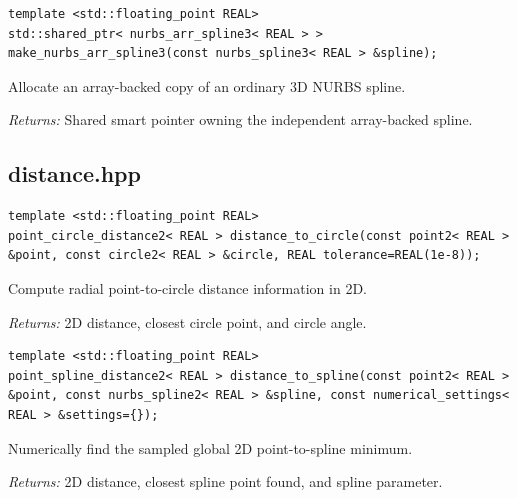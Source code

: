 \par\noindent\begin{minipage}{\linewidth}
\begin{lstlisting}[style=apireference]
template <std::floating_point REAL>
std::shared_ptr< nurbs_arr_spline3< REAL > > make_nurbs_arr_spline3(const nurbs_spline3< REAL > &spline);
\end{lstlisting}
{\footnotesize Allocate an array-backed copy of an ordinary 3D NURBS spline.\par}
{\footnotesize\textit{Returns:} Shared smart pointer owning the independent array-backed spline.\par}
\end{minipage}\par\vspace{1pt}
\subsection{distance.hpp}
\par\noindent\begin{minipage}{\linewidth}
\begin{lstlisting}[style=apireference]
template <std::floating_point REAL>
point_circle_distance2< REAL > distance_to_circle(const point2< REAL > &point, const circle2< REAL > &circle, REAL tolerance=REAL(1e-8));
\end{lstlisting}
{\footnotesize Compute radial point-to-circle distance information in 2D.\par}
{\footnotesize\textit{Returns:} 2D distance, closest circle point, and circle angle.\par}
\end{minipage}\par\vspace{1pt}
\par\noindent\begin{minipage}{\linewidth}
\begin{lstlisting}[style=apireference]
template <std::floating_point REAL>
point_spline_distance2< REAL > distance_to_spline(const point2< REAL > &point, const nurbs_spline2< REAL > &spline, const numerical_settings< REAL > &settings={});
\end{lstlisting}
{\footnotesize Numerically find the sampled global 2D point-to-spline minimum.\par}
{\footnotesize\textit{Returns:} 2D distance, closest spline point found, and spline parameter.\par}
\end{minipage}\par\vspace{1pt}
